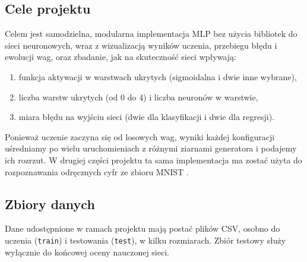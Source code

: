 \documentclass[11pt,a4paper]{article}
\begin{document}
	\subsection{Cele projektu}
	Celem jest samodzielna, modularna implementacja MLP bez użycia bibliotek do sieci neuronowych, wraz z wizualizacją wyników uczenia, przebiegu błędu i ewolucji wag, oraz zbadanie, jak na skuteczność sieci wpływają:
	\begin{enumerate}
		\item funkcja aktywacji w warstwach ukrytych (sigmoidalna i dwie inne wybrane),
		\item liczba warstw ukrytych (od 0 do 4) i liczba neuronów w warstwie,
		\item miara błędu na wyjściu sieci (dwie dla klasyfikacji i dwie dla regresji).
	\end{enumerate}
	Ponieważ uczenie zaczyna się od losowych wag, wyniki każdej konfiguracji uśredniamy po wielu uruchomieniach z różnymi ziarnami generatora i podajemy ich rozrzut. W drugiej części projektu ta sama implementacja ma zostać użyta do rozpoznawania odręcznych cyfr ze zbioru MNIST \cite{lecun1998}.
	
	\subsection{Zbiory danych}
	Dane udostępnione w ramach projektu mają postać plików CSV, osobno do uczenia (\texttt{train}) i testowania (\texttt{test}), w kilku rozmiarach. Zbiór testowy służy wyłącznie do końcowej oceny nauczonej sieci.
	
\end{document}
